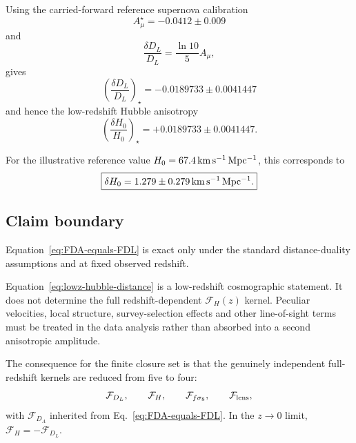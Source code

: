 Using the carried-forward reference supernova calibration
\begin{equation}
A_\mu^\star=-0.0412\pm0.009
\end{equation}
and
\begin{equation}
\frac{\delta D_L}{D_L}
=
\frac{\ln 10}{5}A_\mu ,
\end{equation}
gives
\begin{equation}
\boxed{
\left(
\frac{\delta D_L}{D_L}
\right)_\star
=
-0.0189733\pm0.0041447
}
\end{equation}
and hence the low-redshift Hubble anisotropy
\begin{equation}
\boxed{
\left(
\frac{\delta H_0}{H_0}
\right)_\star
=
+0.0189733\pm0.0041447 .
}
\label{eq:lowz-H0-fraction}
\end{equation}

For the illustrative reference value
$H_0=67.4\,{\rm km\,s^{-1}\,Mpc^{-1}}$, this corresponds to
\begin{equation}
\boxed{
\delta H_0
=
1.279\pm0.279\,
{\rm km\,s^{-1}\,Mpc^{-1}} .
}
\label{eq:lowz-H0-kms}
\end{equation}

\subsection{Claim boundary}

Equation~\eqref{eq:FDA-equals-FDL} is exact only under the standard
distance-duality assumptions and at fixed observed redshift.

Equation~\eqref{eq:lowz-hubble-distance} is a low-redshift cosmographic
statement.  It does not determine the full redshift-dependent
$\mathcal F_H(z)$ kernel.  Peculiar velocities, local structure,
survey-selection effects and other line-of-sight terms must be treated in
the data analysis rather than absorbed into a second anisotropic amplitude.

The consequence for the finite closure set is that the genuinely independent
full-redshift kernels are reduced from five to four:
\begin{equation}
\mathcal F_{D_L},\qquad
\mathcal F_H,\qquad
\mathcal F_{f\sigma_8},\qquad
\mathcal F_{\rm lens},
\end{equation}
with $\mathcal F_{D_A}$ inherited from
Eq.~\eqref{eq:FDA-equals-FDL}.  In the $z\to0$ limit,
$\mathcal F_H=-\mathcal F_{D_L}$.
